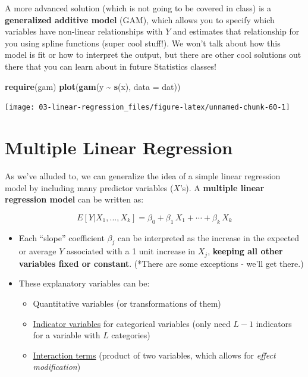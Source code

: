 \documentclass[
]{book}
\newenvironment{Shaded}{\begin{snugshade}}{\end{snugshade}}
\newcommand{\AttributeTok}[1]{\textcolor[rgb]{0.13,0.29,0.53}{#1}}
\newcommand{\FunctionTok}[1]{\textcolor[rgb]{0.13,0.29,0.53}{\textbf{#1}}}
\newcommand{\NormalTok}[1]{#1}
\newcommand{\SpecialCharTok}[1]{\textcolor[rgb]{0.81,0.36,0.00}{\textbf{#1}}}
\providecommand{\tightlist}{%
  \setlength{\itemsep}{0pt}\setlength{\parskip}{0pt}}
\begin{document}
A more advanced solution (which is not going to be covered in class) is a \textbf{generalized additive model} (GAM), which allows you to specify which variables have non-linear relationships with \(Y\) and estimates that relationship for you using spline functions (super cool stuff!). We won't talk about how this model is fit or how to interpret the output, but there are other cool solutions out there that you can learn about in future Statistics classes!

\begin{Shaded}
\begin{Highlighting}[]
\FunctionTok{require}\NormalTok{(gam)}
\FunctionTok{plot}\NormalTok{(}\FunctionTok{gam}\NormalTok{(y }\SpecialCharTok{\textasciitilde{}} \FunctionTok{s}\NormalTok{(x), }\AttributeTok{data =}\NormalTok{ dat))}
\end{Highlighting}
\end{Shaded}

\begin{center}\texttt{[image: 03-linear-regression\_files/figure-latex/unnamed-chunk-60-1]} \end{center}

\section{Multiple Linear Regression}\label{multiple}

As we've alluded to, we can generalize the idea of a simple linear regression model by including many predictor variables (\(X\)'s). A \textbf{multiple linear regression model} can be written as:

\[ E[Y |X_1,...,X_k ] = \beta_0 + \beta_1\,X_{1} + \cdots + \beta_k\,X_{k}  \]

\begin{itemize}
\item
  Each ``slope'' coefficient \(\beta_j\) can be interpreted as the increase in the expected or average \(Y\) associated with a 1 unit increase in \(X_j\), \textbf{keeping all other variables fixed or constant}. (*There are some exceptions - we'll get there.)
\item
  These explanatory variables can be:

  \begin{itemize}
  \tightlist
  \item
    Quantitative variables (or transformations of them)
  \item
    \hyperref[indicator-variables]{Indicator variables} for categorical variables (only need \(L-1\) indicators for a variable with \(L\) categories)
  \item
    \hyperref[interaction-variables]{Interaction terms} (product of two variables, which allows for \emph{effect modification})
  \end{itemize}
\end{itemize}
\end{document}
